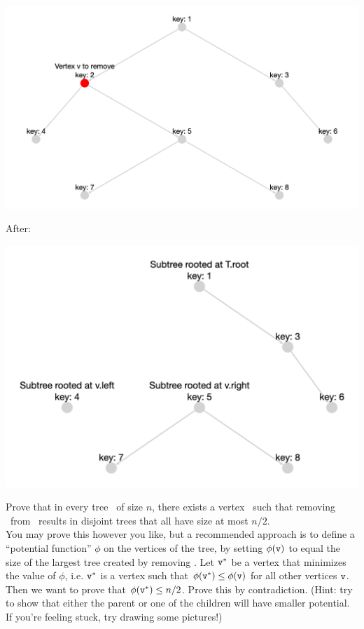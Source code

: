 \documentclass[11pt]{article}
\begin{document}
\begin{enumerate}
\begin{enumerate}
 \includegraphics[scale=.175]{ps0_assets/p0_q1b_before.png}
 
 
 After:
 
  \includegraphics[scale=.225]{ps0_assets/p0_q1b_after.png}

  Prove that in every tree \treeT\ of size $n$, there exists a vertex \btv\ such that removing \btv\ from \treeT\ results in disjoint trees that all have size at most $n/2$.  \\
  
  You may prove this however you like, but a recommended approach is to define a ``potential function'' $\phi$ on the vertices of the tree, by setting $\phi(\texttt{v})$ to equal the size of the largest tree created by removing \btv.  Let $\texttt{v}^*$ be a vertex that minimizes the value of $\phi$, i.e. $\texttt{v}^*$ is a vertex such that $\phi(\texttt{v}^*) \le \phi(\texttt{v})$ for all other vertices $\texttt{v}$. Then we want to prove that $\phi(\texttt{v}^*)\leq n/2$.  Prove this by contradiction.  (Hint: try to show that either the parent or one of the children will have smaller potential. If you're feeling stuck, try drawing some pictures!)
 

\end{enumerate}
\end{enumerate}
\end{document}
